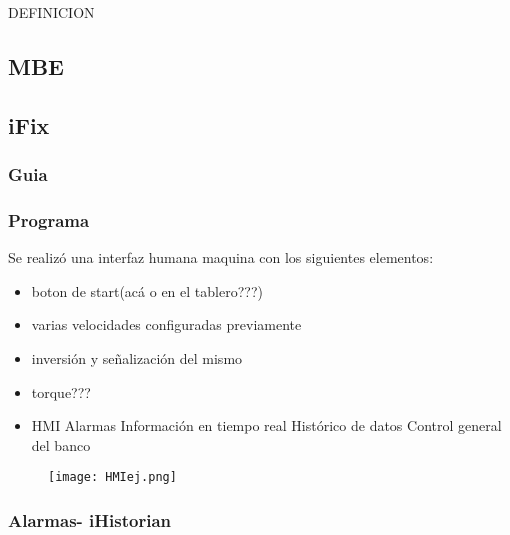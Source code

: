 DEFINICION
\\
\subsection{MBE}
\subsection{iFix}
\subsubsection{Guia}
\subsubsection{Programa}


Se realizó una interfaz humana maquina con los siguientes elementos:
	\begin{itemize}
		\item boton de start(acá o en el tablero???)
		\item varias velocidades configuradas previamente
		\item inversión y señalización del mismo
		\item torque???
		\item HMI
        	\subitem Alarmas
       		\subitem Información en tiempo real
        	\subitem Histórico de datos
        	\subitem Control general del banco
	\end{itemize}
	\begin{figure}[htb]
		\centering
		\texttt{[image: HMIej.png]}
	\end{figure}

\subsubsection{Alarmas- iHistorian}